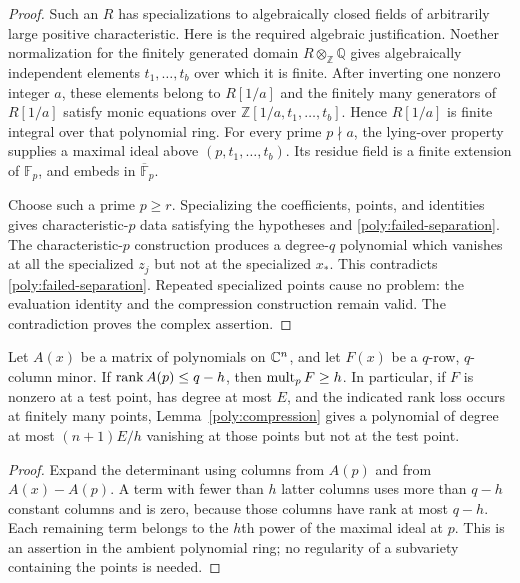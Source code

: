 \begin{proof}
Such an $R$ has specializations to algebraically closed fields of
arbitrarily large positive characteristic.  Here is the required
algebraic justification.  Noether normalization for the finitely
generated domain $R\otimes_{\mathbb Z}\mathbb Q$ gives algebraically
independent elements $t_1,\ldots,t_b$ over which it is finite.  After
inverting one nonzero integer $a$, these elements belong to $R[1/a]$
and the finitely many generators of $R[1/a]$ satisfy monic equations
over $\mathbb Z[1/a,t_1,\ldots,t_b]$.  Hence $R[1/a]$ is finite
integral over that polynomial ring.  For every prime $p\nmid a$, the
lying-over property supplies a maximal ideal above
$(p,t_1,\ldots,t_b)$.  Its residue field is a finite extension of
$\mathbb F_p$, and embeds in $\overline{\mathbb F}_p$.

Choose such a prime $p\ge r$.  Specializing the coefficients, points,
and identities gives characteristic-$p$ data satisfying the hypotheses
and \eqref{poly:failed-separation}.  The characteristic-$p$ construction
produces a degree-$q$ polynomial which vanishes at all the specialized
$z_j$ but not at the specialized $x_*$.  This contradicts
\eqref{poly:failed-separation}.  Repeated specialized points cause no
problem: the evaluation identity and the compression construction
remain valid.  The contradiction proves the complex assertion.
\end{proof}

\begin{lemma}
\label{poly:matrix-multiplicity}
Let $A(x)$ be a matrix of polynomials on $\mathbb C^n$, and let $F(x)$ be a
$q$-row, $q$-column minor.  If $\operatorname{rank} A(p)\le q-h$, then
$\operatorname{mult}_pF\ge h$.  In particular, if $F$ is nonzero at a test point,
has degree at most $E$, and the indicated rank loss occurs at finitely
many points, Lemma~\ref{poly:compression} gives a polynomial of degree
at most $(n+1)E/h$ vanishing at those points but not at the test point.
\end{lemma}

\begin{proof}
Expand the determinant using columns from $A(p)$ and from
$A(x)-A(p)$.  A term with fewer than $h$ latter columns uses more
than $q-h$ constant columns and is zero, because those columns have
rank at most $q-h$.  Each remaining term belongs to the $h$th power
of the maximal ideal at $p$.  This is an assertion in the ambient
polynomial ring; no regularity of a subvariety containing the points
is needed.
\end{proof}

